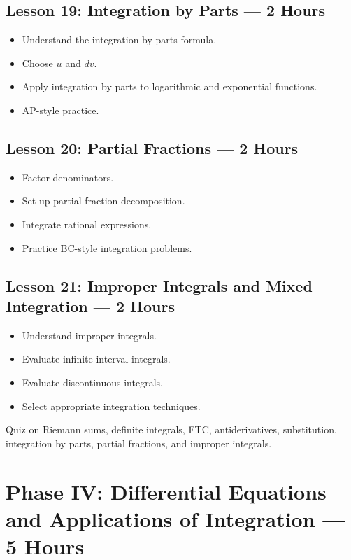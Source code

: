 \documentclass[11pt]{article}
\newcommand{\circnum}[1]{%
\tikz[baseline=(char.base)]{
\node[shape=circle, draw=NovelPurple, text=NovelPurple, line width=0.8pt, inner sep=1.6pt] (char) {\small #1};
}}
\begin{document}
\subsection*{\circnum{19} Lesson 19: Integration by Parts --- 2 Hours}
\begin{itemize}
    \item Understand the integration by parts formula.
    \item Choose $u$ and $dv$.
    \item Apply integration by parts to logarithmic and exponential functions.
    \item AP-style practice.
\end{itemize}

\subsection*{\circnum{20} Lesson 20: Partial Fractions --- 2 Hours}
\begin{itemize}
    \item Factor denominators.
    \item Set up partial fraction decomposition.
    \item Integrate rational expressions.
    \item Practice BC-style integration problems.
\end{itemize}

\subsection*{\circnum{21} Lesson 21: Improper Integrals and Mixed Integration --- 2 Hours}
\begin{itemize}
    \item Understand improper integrals.
    \item Evaluate infinite interval integrals.
    \item Evaluate discontinuous integrals.
    \item Select appropriate integration techniques.
\end{itemize}

\begin{tcolorbox}[colback=SoftGray, colframe=NovelPurple, title=\textbf{Checkpoint 3}]
Quiz on Riemann sums, definite integrals, FTC, antiderivatives, substitution, integration by parts, partial fractions, and improper integrals.
\end{tcolorbox}

\section*{Phase IV: Differential Equations and Applications of Integration --- 5 Hours}
\end{document}
